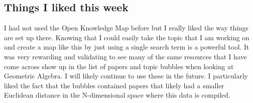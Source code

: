 \documentclass[journal]{IEEEtran}
\begin{document}
\subsection{Things I liked this week}
\noindent
I had not used the Open Knowledge Map before but I really liked the way things are set up there. Knowing that I could easily take the topic that I am working on and create a map like this by just using a single search term is a powerful tool. It was very rewarding and validating to see many of the same resources that I have come across show up in the list of papers and topic bubbles when looking at Geometric Algebra. I will likely continue to use these in the future. I particularly liked the fact that the bubbles contained papers that likely had a smaller Euclidean distance in the N-dimensional space where this data is compiled.


\end{document}

